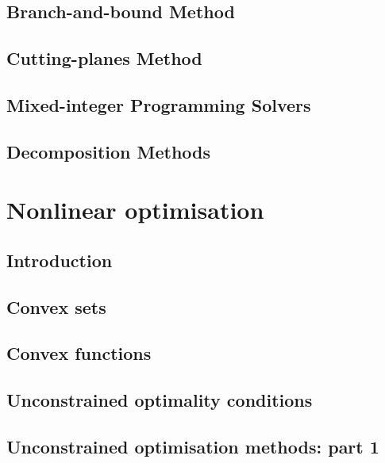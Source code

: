\documentclass{bookest}
\begin{document}
	\chapter{Branch-and-bound Method} \label{chapter_9}
	
	
	\chapter{Cutting-planes Method} \label{chapter_10}
	
	
	\chapter{Mixed-integer Programming Solvers} \label{chapter_11}
	
	
	\chapter{Decomposition Methods} \label{chapter_12}
	
		
	
	\part{Nonlinear optimisation} \label{part_2}
		
	\chapter{Introduction}
	
	
	\chapter{Convex sets}
	
	
	\chapter{Convex functions}
	
	
	\chapter{Unconstrained optimality conditions}
	
	
	\chapter{Unconstrained optimisation methods: part 1}
	
	
\end{document}
